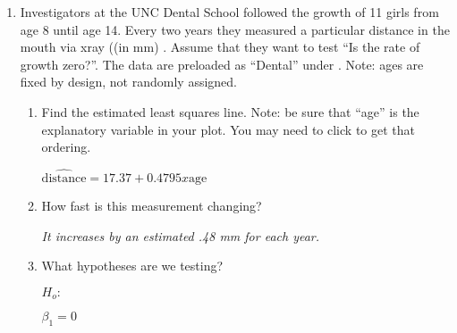 \begin{enumerate}

\item Investigators at the UNC Dental School followed the growth of 11
  girls from age 8 until age 14.  Every two years they measured a
  particular distance in the mouth via xray ((in mm) .  Assume that
  they want to test ``Is the rate of growth zero?''.  The data are
  preloaded as ``Dental'' under .  Note: ages are fixed by
  design, not randomly assigned.
     \begin{enumerate}
     \item Find the estimated least squares line.  Note: be sure that
       ``age'' is the explanatory variable in your plot. You may need
       to click  to get that ordering.
\begin{students}
  \vspace{1.5cm}
\end{students} 

\begin{key}
  {\it $\widehat{\mbox{distance}} = 17.37 + 0.4795 x \mbox{age}$}
\end{key}

     \item How fast is this measurement changing?
\begin{students}
  \vspace{1.5cm}
\end{students} 

\begin{key}
  {\it It increases by an estimated .48 mm for each year.}
\end{key}

     \item What hypotheses are we testing?

  $H_o:$
\begin{students}
 \vspace{1cm}      
\end{students}
\begin{key}
  {\it  $\beta_1 = 0$   }
\end{key}


\end{enumerate}
\end{enumerate}
